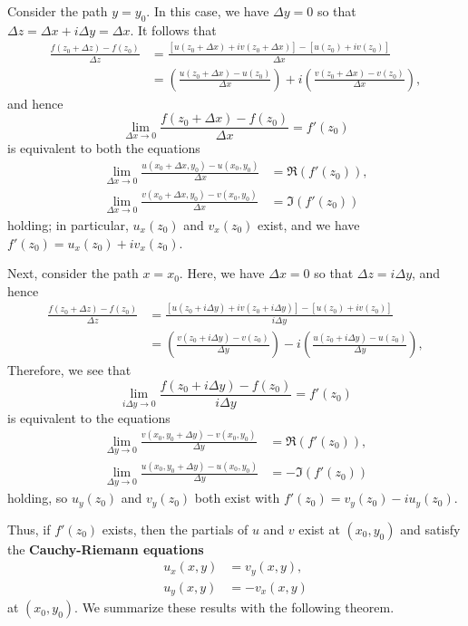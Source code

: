 \documentclass[10pt]{article}
\theoremstyle{newstyle}
\begin{document}
Consider the path $y = y_0$. In this case, we have $\Delta y = 0$ so that $\Delta z = 
\Delta x + i\Delta y = \Delta x$. It follows that 
\begin{align*}
    \frac{f(z_0 + \Delta z) - f(z_0)}{\Delta z} 
    &= \frac{[u(z_0 + \Delta x) + iv(z_0 + \Delta x)] - [u(z_0)  + iv(z_0)]}{\Delta x} \\
    &= \left( \frac{u(z_0 + \Delta x) - u(z_0)}{\Delta x} \right) 
    + i \left( \frac{v(z_0 + \Delta x) - v(z_0)}{\Delta x} \right), 
\end{align*}
and hence 
\[ \lim_{\Delta x \to 0} \frac{f(z_0 + \Delta x) - f(z_0)}{\Delta x} = f'(z_0) \]
is equivalent to both the equations 
\begin{align*}
    \lim_{\Delta x \to 0} \frac{u(x_0 + \Delta x, y_0) - u(x_0, y_0)}{\Delta x} &= \Re(f'(z_0)), \\
    \lim_{\Delta x \to 0} \frac{v(x_0 + \Delta x, y_0) - v(x_0, y_0)}{\Delta x} &= \Im(f'(z_0))
\end{align*}
holding; in particular, $u_x(z_0)$ and $v_x(z_0)$ exist, and we have $f'(z_0) = 
u_x(z_0) + iv_x(z_0)$. 

Next, consider the path $x = x_0$. Here, we have $\Delta x = 0$ so that $\Delta z = i\Delta y$, 
and hence 
\begin{align*}
    \frac{f(z_0 + \Delta z) - f(z_0)}{\Delta z} 
    &= \frac{[u(z_0 + i\Delta y) + iv(z_0 + i\Delta y)] - [u(z_0)  + iv(z_0)]}{i\Delta y} \\
    &= \left( \frac{v(z_0 + i\Delta y) - v(z_0)}{\Delta y} \right) 
    - i \left( \frac{u(z_0 + i\Delta y) - u(z_0)}{\Delta y} \right), 
\end{align*}
Therefore, we see that 
\[ \lim_{i\Delta y \to 0} \frac{f(z_0 + i\Delta y) - f(z_0)}{i\Delta y} = f'(z_0) \]
is equivalent to the equations 
\begin{align*}
    \lim_{\Delta y \to 0} \frac{v(x_0, y_0 + \Delta y) - v(x_0, y_0)}{\Delta y} &= \Re(f'(z_0)), \\
    \lim_{\Delta y \to 0} \frac{u(x_0, y_0 + \Delta y) - u(x_0, y_0)}{\Delta y} &= -\Im(f'(z_0))
\end{align*}
holding, so $u_y(z_0)$ and $v_y(z_0)$ both exist with $f'(z_0) = v_y(z_0) - iu_y(z_0)$. 

Thus, if $f'(z_0)$ exists, then the partials of $u$ and $v$ exist at $(x_0, y_0)$ and satisfy the 
{\bf Cauchy-Riemann equations} 
\begin{align*}
    u_x(x, y) &= v_y(x, y), \\
    u_y(x, y) &= -v_x(x, y)
\end{align*}
at $(x_0, y_0)$. We summarize these results with the following theorem.
\end{document}

